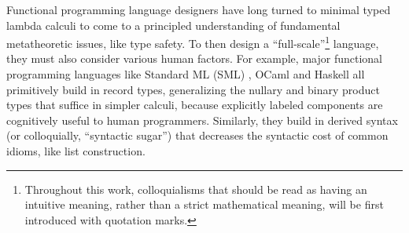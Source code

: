 Functional programming language designers have long turned to minimal typed lambda calculi to come to a principled understanding of  fundamental metatheoretic issues, like type safety. To then design a ``full-scale''\footnote{Throughout this work, colloquialisms that should be read as having an intuitive meaning, rather than a strict mathematical meaning, will be first introduced with quotation marks.}  language, they must also consider various human factors. 
For example, major functional programming languages like Standard ML (SML) \cite{mthm97-for-dart,harper1997programming}, OCaml \cite{ocaml-manual} and Haskell \cite{jones2003haskell} all primitively build in record types, generalizing the nullary and binary product types that suffice in simpler calculi, because explicitly labeled components are cognitively useful to human programmers. Similarly, they build in derived syntax (or colloquially, ``syntactic sugar'') that decreases the syntactic cost of  common idioms, like list construction.%
%

